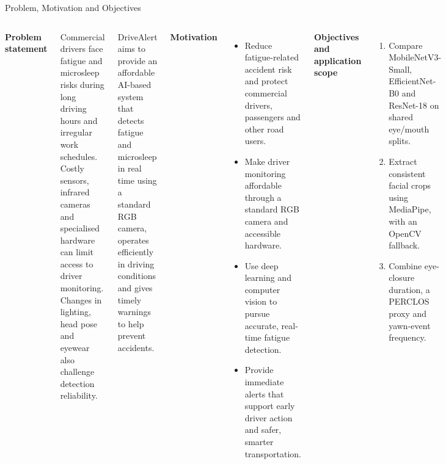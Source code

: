 \documentclass[aspectratio=169,10pt]{beamer}
\renewcommand{\arraystretch}{1.22}
\begin{document}
\begin{frame}[t]{Problem, Motivation and Objectives}
\fontsize{10}{11.5}\selectfont
\renewcommand{\arraystretch}{1.06}
\setlength{\tabcolsep}{4pt}
\setlength{\abovedisplayskip}{4pt}
\setlength{\belowdisplayskip}{4pt}
\fontsize{10}{11.5}\selectfont
\renewcommand{\arraystretch}{1.06}
\setlength{\tabcolsep}{3pt}
\setlength{\abovedisplayskip}{3pt}
\setlength{\belowdisplayskip}{3pt}
\begin{columns}[T,onlytextwidth]
\textbf{Problem statement}\par\vspace{1pt}
Commercial drivers face fatigue and microsleep risks during long driving hours and irregular work schedules. Costly sensors, infrared cameras and specialised hardware can limit access to driver monitoring. Changes in lighting, head pose and eyewear also challenge detection reliability.
\par\smallskip
DriveAlert aims to provide an affordable AI-based system that detects fatigue and microsleep in real time using a standard RGB camera, operates efficiently in driving conditions and gives timely warnings to help prevent accidents.
\par\medskip
\textbf{Motivation}\par\vspace{1pt}
\begin{itemize}\setlength\itemsep{2pt}
\item Reduce fatigue-related accident risk and protect commercial drivers, passengers and other road users.
\item Make driver monitoring affordable through a standard RGB camera and accessible hardware.
\item Use deep learning and computer vision to pursue accurate, real-time fatigue detection.
\item Provide immediate alerts that support early driver action and safer, smarter transportation.
\end{itemize}
\textbf{Objectives and application scope}\par\vspace{1pt}
\begin{enumerate}\setlength\itemsep{0pt}
\item Compare MobileNetV3-Small, EfficientNet-B0 and ResNet-18 on shared eye/mouth splits.
\item Extract consistent facial crops using MediaPipe, with an OpenCV fallback.
\item Combine eye-closure duration, a PERCLOS proxy and yawn-event frequency.

\end{enumerate}
\end{columns}
\end{frame}
\end{document}
